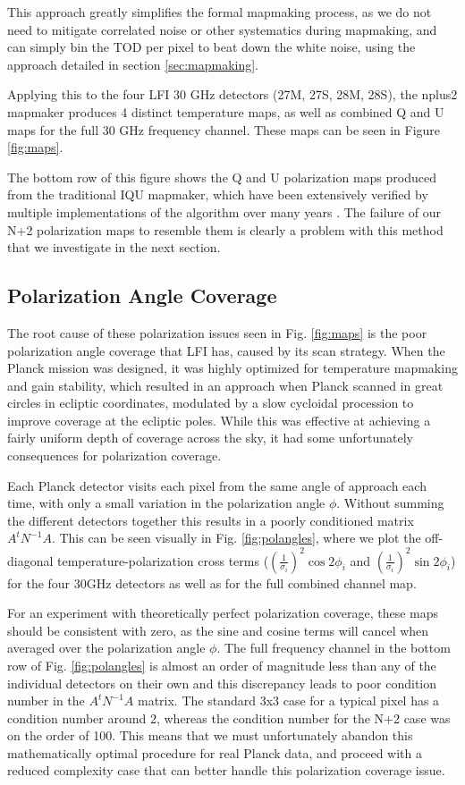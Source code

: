 \documentclass{aa}
\begin{document}
This approach greatly simplifies the formal mapmaking process, as we do not need to mitigate correlated noise or other systematics during mapmaking, and can simply bin the TOD per pixel to beat down the white noise, using the approach detailed in section \ref{sec:mapmaking}.

Applying this to the four LFI 30 GHz detectors (27M, 27S, 28M, 28S), the nplus2 mapmaker produces 4 distinct temperature maps, as well as combined Q and U maps for the full 30 GHz frequency channel. These maps can be seen in Figure \ref{fig:maps}.

The bottom row of this figure shows the Q and U polarization maps produced from the traditional IQU mapmaker, which have been extensively verified by multiple implementations of the algorithm over many years \citep{lfi2013,lfi2015,lfi2018}. The failure of our N+2 polarization maps to resemble them is clearly a problem with this method that we investigate in the next section.

\subsection{Polarization Angle Coverage}

The root cause of these polarization issues seen in Fig. \ref{fig:maps} is the poor polarization angle coverage that LFI has, caused by its scan strategy. When the Planck mission was designed, it was highly optimized for temperature mapmaking and gain stability, which resulted in an approach when Planck scanned in great circles in ecliptic coordinates, modulated by a slow cycloidal procession to improve coverage at the ecliptic poles. \citep{planckScan} While this was effective at achieving a fairly uniform depth of coverage across the sky, it had some unfortunately consequences for polarization coverage.

Each Planck detector visits each pixel from the same angle of approach each time, with only a small variation in the polarization angle $\phi$. Without summing the different detectors together this results in a poorly conditioned matrix $A^tN^{-1}A$. This can be seen visually in Fig. \ref{fig:polangles}, where we plot the off-diagonal temperature-polarization cross terms ($(\frac{1}{\sigma_i})^2\cos2\phi_i$ and $(\frac{1}{\sigma_i})^2 \sin2\phi_i$) for the four 30GHz detectors as well as for the full combined channel map. 

For an experiment with theoretically perfect polarization coverage, these maps should be consistent with zero, as the sine and cosine terms will cancel when averaged over the polarization angle $\phi$. The full frequency channel in the bottom row of Fig. \ref{fig:polangles} is almost an order of magnitude less than any of the individual detectors on their own and this discrepancy leads to poor condition number in the $A^t N^{-1}A$ matrix. The standard 3x3 case for a typical pixel has a condition number around 2, whereas the condition number for the N+2 case was on the order of 100. This means that we must unfortunately abandon this mathematically optimal procedure for real Planck data, and proceed with a reduced complexity case that can better handle this polarization coverage issue.
\end{document}
